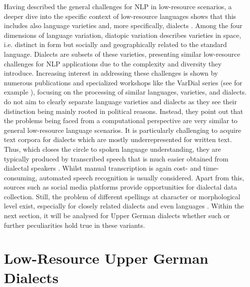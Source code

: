 \documentclass[11pt,a4paper,twoside,openright]{scrbook}
\begin{document}
Having described the general challenges for NLP in low-resource scenarios, a deeper dive into the specific context of low-resource languages shows that this includes also language varieties and, more specifically, dialects \citep{Zampieri_Nakov_Scherrer_2020}. Among the four dimensions of language variation, diatopic variation describes varieties in space, i.e. distinct in form but socially and geographically related to the standard language. Dialects are subsets of these varieties, presenting similar low-resource challenges for NLP applications due to the complexity and diversity they introduce. Increasing interest in addressing these challenges is shown by numerous publications and specialized workshops like the VarDial series (see for example \citet{2023-findings-vardial}), focusing on the processing of similar languages, varieties, and dialects. \citet{Zampieri_Nakov_Scherrer_2020} do not aim to clearly separate language varieties and dialects as they see their distinction being mainly rooted in political reasons. Instead, they point out that the problems being faced from a computational perspective are very similar to general low-resource language scenarios. It is particularly challenging to acquire text corpora for dialects which are mostly underrepresented for written text. Thus, which closes the circle to spoken language understanding, they are typically produced by transcribed speech that is much easier obtained from dialectal speakers \citep{Zampieri_Nakov_Scherrer_2020}. Whilst manual transcription is again cost- and time-consuming, automated speech recognition is usually considered. Apart from this, sources such as social media platforms provide opportunities for dialectal data collection. Still, the problem of different spellings at character or morphological level exist, especially for closely related dialects and even languages \citep{Zampieri_Nakov_Scherrer_2020}. Within the next section, it will be analysed for Upper German dialects whether such or further peculiarities hold true in these variants.









\section{Low-Resource Upper German Dialects}
\end{document}
